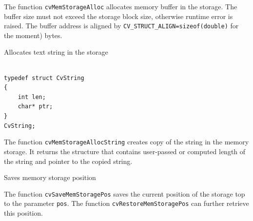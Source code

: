The function \texttt{cvMemStorageAlloc} allocates memory buffer in
the storage. The buffer size must not exceed the storage block size,
otherwise runtime error is raised. The buffer address is aligned by
\texttt{CV\_STRUCT\_ALIGN=sizeof(double)} for the moment) bytes.

\label{MemStorageAllocString}

Allocates text string in the storage


\begin{lstlisting}

typedef struct CvString
{
    int len;
    char* ptr;
}
CvString;

\end{lstlisting}

\begin{description}
\end{description}

The function \texttt{cvMemStorageAllocString} creates copy of the string
in the memory storage. It returns the structure that contains user-passed
or computed length of the string and pointer to the copied string.

\label{SaveMemStoragePos}

Saves memory storage position


\begin{description}
\end{description}

The function \texttt{cvSaveMemStoragePos} saves the current position
of the storage top to the parameter \texttt{pos}. The function
\texttt{cvRestoreMemStoragePos} can further retrieve this position.

\label{RestoreMemStoragePos}

